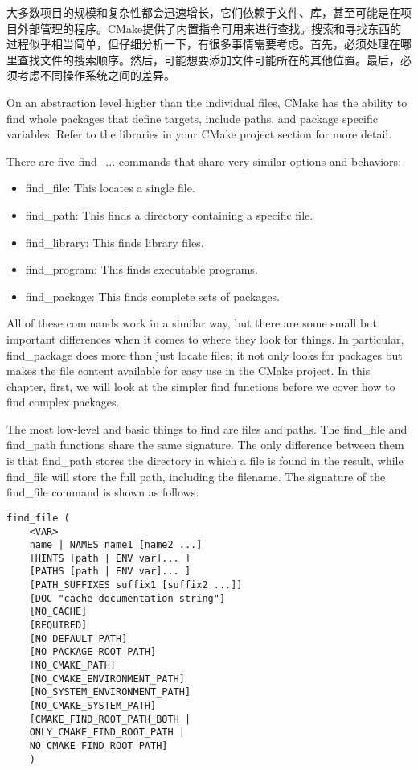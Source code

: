
大多数项目的规模和复杂性都会迅速增长，它们依赖于文件、库，甚至可能是在项目外部管理的程序。CMake提供了内置指令可用来进行查找。搜索和寻找东西的过程似乎相当简单，但仔细分析一下，有很多事情需要考虑。首先，必须处理在哪里查找文件的搜索顺序。然后，可能想要添加文件可能所在的其他位置。最后，必须考虑不同操作系统之间的差异。

On an abstraction level higher than the individual files, CMake has the ability to find whole packages that define targets, include paths, and package specific variables. Refer to the libraries in your CMake project section for more detail.

There are five find\_... commands that share very similar options and behaviors:

\begin{itemize}
\item 
find\_file: This locates a single file.

\item 
find\_path: This finds a directory containing a specific file.

\item 
find\_library: This finds library files.

\item 
find\_program: This finds executable programs.

\item 
find\_package: This finds complete sets of packages.
\end{itemize}

All of these commands work in a similar way, but there are some small but important differences when it comes to where they look for things. In particular, find\_package does more than just locate files; it not only looks for packages but makes the file content available for easy use in the CMake project. In this chapter, first, we will look at the simpler find functions before we cover how to find complex packages.


The most low-level and basic things to find are files and paths. The find\_file and find\_path functions share the same signature. The only difference between them is that find\_path stores the directory in which a file is found in the result, while find\_file will store the full path, including the filename. The signature of the find\_file command is shown as follows:

\begin{lstlisting}[style=styleCMake]
find_file (
	<VAR>
	name | NAMES name1 [name2 ...]
	[HINTS [path | ENV var]... ]
	[PATHS [path | ENV var]... ]
	[PATH_SUFFIXES suffix1 [suffix2 ...]]
	[DOC "cache documentation string"]
	[NO_CACHE]
	[REQUIRED]
	[NO_DEFAULT_PATH]
	[NO_PACKAGE_ROOT_PATH]
	[NO_CMAKE_PATH]
	[NO_CMAKE_ENVIRONMENT_PATH]
	[NO_SYSTEM_ENVIRONMENT_PATH]
	[NO_CMAKE_SYSTEM_PATH]
	[CMAKE_FIND_ROOT_PATH_BOTH |
	ONLY_CMAKE_FIND_ROOT_PATH |
	NO_CMAKE_FIND_ROOT_PATH]
	)
\end{lstlisting}

